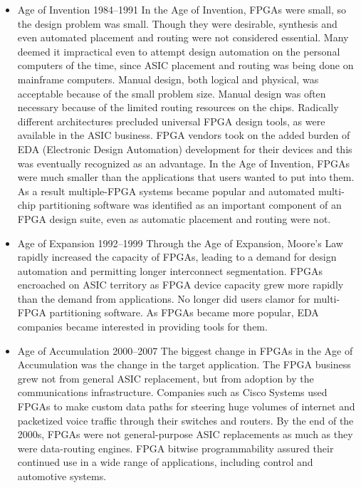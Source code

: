\begin{itemize}
	\item Age of Invention 1984–1991
	\newline
	In the Age of Invention, FPGAs were small, so the design problem was small. Though they were desirable, synthesis
	and even automated placement and routing were not considered essential. Many deemed it impractical even to
	attempt design automation on the personal computers of the time, since ASIC placement and routing was being
	done on mainframe computers.
	Manual design, both
	logical and physical, was acceptable because of the small problem size. Manual design was often necessary because
	of the limited routing resources on the chips.
	Radically different architectures precluded universal FPGA design tools, as were available in the ASIC business.
	FPGA vendors took on the added burden of EDA (Electronic Design Automation) development for their devices and this was eventually recognized as an advantage.
	\newline
	In the Age of Invention, FPGAs were much smaller than the applications that users wanted to put into them. As a
	result multiple-FPGA systems became popular and automated multi-chip partitioning software was identified as
	an important component of an FPGA design suite, even as automatic placement and routing were not.
	\item Age of Expansion 1992–1999
	\newline
	Through the Age of Expansion, Moore’s Law rapidly increased the capacity of FPGAs, leading to a demand for
	design automation and permitting longer interconnect segmentation.
	FPGAs encroached on ASIC territory as FPGA device capacity grew more rapidly than the
	demand from applications. No longer did users clamor for multi-FPGA partitioning software.
	As FPGAs became more popular, EDA companies became interested in providing tools for them.
	\item Age of Accumulation 2000–2007
	\newline
	The biggest change in FPGAs in the Age of Accumulation was the change in the target application. The FPGA
	business grew not from general ASIC replacement, but from adoption by the communications infrastructure. Companies
	such as Cisco Systems used FPGAs to make custom data paths for steering huge volumes of internet and packetized
	voice traffic through their switches and routers.
	By the end of the 2000s, FPGAs were not general-purpose ASIC replacements as much as they were data-routing engines.
	FPGA bitwise programmability assured their continued use in a wide range of applications, including control and automotive systems.
\end{itemize}


